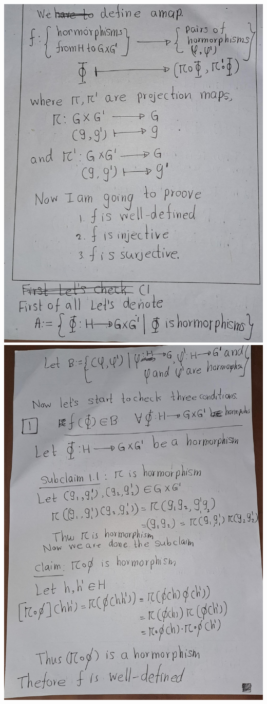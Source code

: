 \documentclass[
]{book}
\begin{document}
\includegraphics{figures/ch_2/fig11.jpg}
\includegraphics{figures/ch_2/fig12.jpg}
\end{document}
